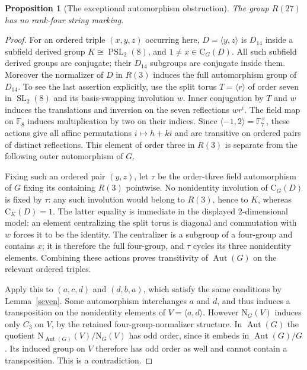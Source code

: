 \documentclass[11pt,a4paper]{article}
\newtheorem{proposition}[lemma]{Proposition}
\newcommand{\gen}[1]{\langle #1\rangle}
\newcommand{\Cent}{\mathrm C}
\newcommand{\Norm}{\mathrm N}
\newcommand{\Aut}{\operatorname{Aut}}
\begin{document}
\begin{proposition}[The exceptional automorphism obstruction]\label{exception}
The group $R(27)$ has no rank-four string marking.
\end{proposition}
\begin{proof}
For an ordered triple $(x,y,z)$ occurring here, $D=\gen{y,z}$ is
$D_{14}$ inside a subfield derived group $K\cong\operatorname{PSL}_2(8)$,
and $1\ne x\in\Cent_G(D)$. All such subfield derived groups are
conjugate; their $D_{14}$ subgroups are conjugate inside them.
Moreover the normalizer of $D$ in $R(3)$ induces the full automorphism
group of $D_{14}$. To see the last assertion explicitly, use the
split torus $T=\gen r$ of order seven in $\operatorname{SL}_2(8)$
and its basis-swapping involution $w$. Inner conjugation by $T$ and
$w$ induces the translations and inversion on the seven reflections
$wr^i$. The field map on $\mathbb F_8$ induces multiplication by two
on their indices. Since $\gen{-1,2}=\mathbb F_7^\times$, these actions
give all affine permutations $i\mapsto h+ki$ and are transitive on
ordered pairs of distinct reflections. This element of order three
in $R(3)$ is separate from the following outer automorphism of $G$.

Fixing such an ordered pair $(y,z)$, let $\tau$ be the order-three
field automorphism of $G$ fixing its containing $R(3)$ pointwise.
No nonidentity involution of $\Cent_G(D)$ is fixed by $\tau$:
any such involution would belong to $R(3)$, hence to $K$, whereas
$\Cent_K(D)=1$. The latter equality is immediate in the displayed
$2$-dimensional model: an element centralizing the split torus is
diagonal and commutation with $w$ forces it to be the identity.
The centralizer is a subgroup of a four-group and contains $x$;
it is therefore the full four-group, and $\tau$ cycles its three
nonidentity elements. Combining these actions proves transitivity
of $\Aut(G)$ on the relevant ordered triples.

Apply this to $(a,c,d)$ and $(d,b,a)$, which satisfy the same
conditions by Lemma~\ref{seven}. Some automorphism interchanges
$a$ and $d$, and thus induces a transposition on the nonidentity
elements of $V=\gen{a,d}$. However $\Norm_G(V)$ induces only $C_3$
on $V$, by the retained four-group-normalizer structure. In
$\Aut(G)$ the quotient $\Norm_{\Aut(G)}(V)/\Norm_G(V)$ has odd
order, since it embeds in $\Aut(G)/G$. Its induced group on $V$
therefore has odd order as well and cannot contain a transposition.
This is a contradiction.
\end{proof}
\end{document}
